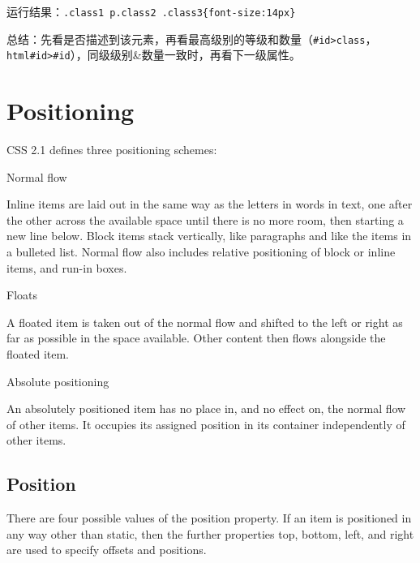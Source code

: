 运行结果：\verb|.class1 p.class2 .class3{font-size:14px}|

总结：先看是否描述到该元素，再看最高级别的等级和数量（\texttt{\#id>class}，\texttt{html\#id>\#id}），同级级别\&数量一致时，再看下一级属性。


\chapter{Positioning}


CSS 2.1 defines three positioning schemes:

\begin{compactitem}
\item Normal flow


Inline items are laid out in the same way as the letters in words in text, one after the other across the available space until there is no more room, then starting a new line below. Block items stack vertically, like paragraphs and like the items in a bulleted list. Normal flow also includes relative positioning of block or inline items, and run-in boxes.


\item Floats

A floated item is taken out of the normal flow and shifted to the left or right as far as possible in the space available. Other content then flows alongside the floated item.

\item Absolute positioning

An absolutely positioned item has no place in, and no effect on, the normal flow of other items. It occupies its assigned position in its container independently of other items.


\end{compactitem}



\section{Position}


There are four possible values of the position property. If an item is positioned in any way other than static, then the further properties top, bottom, left, and right are used to specify offsets and positions.


